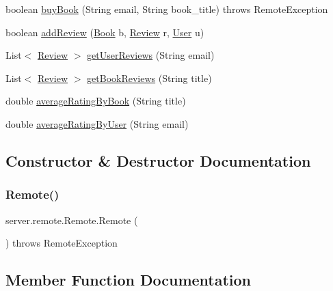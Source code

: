 \begin{DoxyCompactItemize}
\item 
boolean \hyperlink{classserver_1_1remote_1_1_remote_af5d1abb1730b8db14ab9dd476df158d8}{buy\+Book} (String email, String book\+\_\+title)  throws Remote\+Exception
\item 
boolean \hyperlink{classserver_1_1remote_1_1_remote_af94163cf6d5c40cfc880eb517d56aa48}{add\+Review} (\hyperlink{classserver_1_1data_1_1_book}{Book} b, \hyperlink{classserver_1_1data_1_1_review}{Review} r, \hyperlink{classserver_1_1data_1_1_user}{User} u)
\item 
List$<$ \hyperlink{classserver_1_1data_1_1_review}{Review} $>$ \hyperlink{classserver_1_1remote_1_1_remote_a396c96a6b8802c2b4658ecccd37e84db}{get\+User\+Reviews} (String email)
\item 
List$<$ \hyperlink{classserver_1_1data_1_1_review}{Review} $>$ \hyperlink{classserver_1_1remote_1_1_remote_a501e5c5fe847917c9615f0772864a147}{get\+Book\+Reviews} (String title)
\item 
double \hyperlink{classserver_1_1remote_1_1_remote_afd253ddc199a34a1e05317878f957cc9}{average\+Rating\+By\+Book} (String title)
\item 
double \hyperlink{classserver_1_1remote_1_1_remote_a67fc7aeeb889a80cda6e1a5f83858c2a}{average\+Rating\+By\+User} (String email)
\end{DoxyCompactItemize}


\subsection{Constructor \& Destructor Documentation}
\mbox{\label{classserver_1_1remote_1_1_remote_a023cdc695c53195005bf645a97307529}} 
\subsubsection{\texorpdfstring{Remote()}{Remote()}}
{\footnotesize\ttfamily server.\+remote.\+Remote.\+Remote (\begin{DoxyParamCaption}{ }\end{DoxyParamCaption}) throws Remote\+Exception}



\subsection{Member Function Documentation}
\mbox{\label{classserver_1_1remote_1_1_remote_a496fcecd259c1b527ffba62fc452afee}} 
